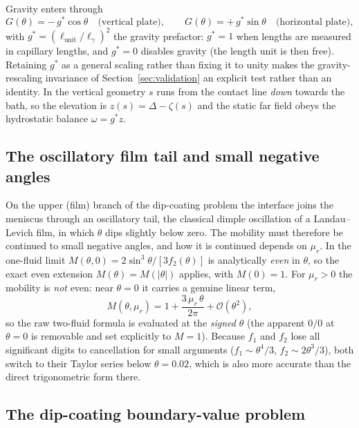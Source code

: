 \documentclass[11pt,a4paper]{article}
\newcommand{\lgamma}{\ell_\gamma}
\newcommand{\mur}{\mu_r}
\begin{document}
Gravity enters through
\begin{equation}
  G(\theta) = -\,g^{*}\cos\theta \quad\text{(vertical plate)}, \qquad
  G(\theta) = +\,g^{*}\sin\theta \quad\text{(horizontal plate)},
\end{equation}
with $g^{*} = (\ell_{\mathrm{unit}}/\lgamma)^{2}$ the gravity prefactor:
$g^{*} = 1$ when lengths are measured in capillary lengths, and $g^{*} = 0$
disables gravity (the length unit is then free). Retaining $g^{*}$ as a general
scaling rather than fixing it to unity makes the gravity-rescaling invariance
of Section~\ref{sec:validation} an explicit test rather than an identity. In
the vertical geometry $s$ runs from the contact line \emph{down} towards the
bath, so the elevation is $z(s) = \Delta - \zeta(s)$ and the static far field
obeys the hydrostatic balance $\omega = g^{*} z$.

\subsection{The oscillatory film tail and small negative angles}

On the upper (film) branch of the dip-coating problem the interface joins the
meniscus through an oscillatory tail, the classical dimple oscillation of a
Landau--Levich film, in which $\theta$ dips slightly below zero. The mobility
must therefore be continued to small negative angles, and how it is continued
depends on $\mur$. In the one-fluid limit $M(\theta,0) = 2\sin^{3}\theta/
[3 f_2(\theta)]$ is analytically \emph{even} in $\theta$, so the exact even
extension $M(\theta) = M(|\theta|)$ applies, with $M(0) = 1$. For $\mur > 0$
the mobility is \emph{not} even: near $\theta = 0$ it carries a genuine linear
term,
\begin{equation}
  M(\theta,\mur) = 1 + \frac{3\,\mur\,\theta}{2\pi} + \mathcal{O}(\theta^{2}),
  \label{eq:mobility-small}
\end{equation}
so the raw two-fluid formula is evaluated at the \emph{signed} $\theta$ (the
apparent $0/0$ at $\theta = 0$ is removable and set explicitly to $M = 1$).
Because $f_1$ and $f_2$ lose all significant digits to cancellation for small
arguments ($f_1 \sim \theta^{4}/3$, $f_2 \sim 2\theta^{3}/3$), both switch to
their Taylor series below $\theta = 0.02$, which is also more accurate than the
direct trigonometric form there.

\subsection{The dip-coating boundary-value problem}
\end{document}
